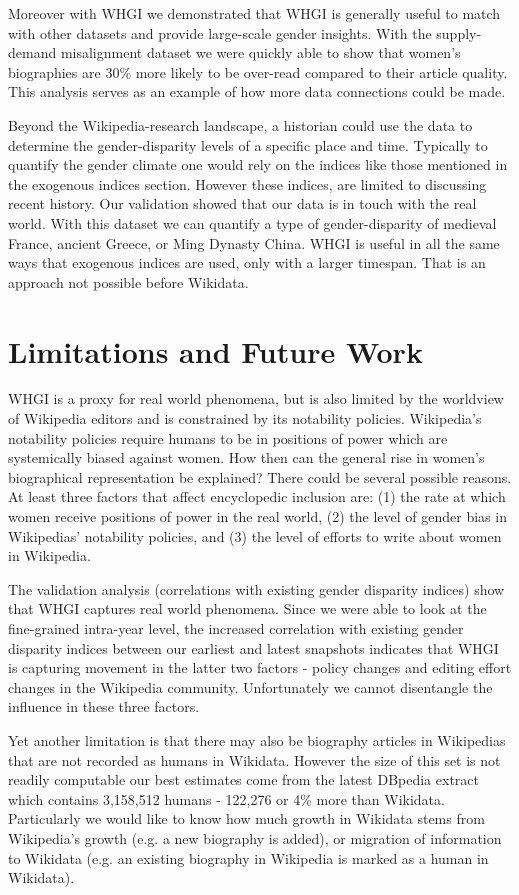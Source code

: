 \documentclass{sig-alternate-05-2015}
\begin{document}
Moreover with WHGI we demonstrated that WHGI is generally useful to match with other datasets and provide large-scale gender insights. With the supply-demand misalignment dataset we were quickly able to show that women's biographies are 30\% more likely to be over-read compared to their article quality. This analysis serves as an example of how more data connections could be made. 

Beyond the Wikipedia-research landscape, a historian could use the data to determine the gender-disparity levels of a specific place and time. Typically to quantify the gender climate one would rely on the indices like those mentioned in the exogenous indices section. However these indices, are limited to discussing recent history. Our validation showed that our data is in touch with the real world. With this dataset we can quantify a type of gender-disparity of medieval France, ancient Greece, or Ming Dynasty China. WHGI is useful in all the same ways that exogenous indices are used, only with a larger timespan. That is an approach not possible before Wikidata.

\section{Limitations and Future Work}
WHGI is a proxy for real world phenomena, but is also limited by the worldview of Wikipedia editors and is constrained by its notability policies. 
Wikipedia's notability policies require humans to be in positions of power which are systemically biased against women. How then can the general rise in women's biographical representation be explained? There could be several possible reasons. At least three factors that affect encyclopedic inclusion are: (1) the rate at which women receive positions of power in the real world, (2) the level of gender bias in Wikipedias' notability policies, and (3) the level of efforts to write about women in Wikipedia. 

The validation analysis (correlations with existing gender disparity indices) show that WHGI captures real world phenomena. Since we were able to look at the fine-grained intra-year level, the increased correlation with existing gender disparity indices between our earliest and latest snapshots indicates that WHGI is capturing movement in the latter two factors - policy changes and editing effort changes in the Wikipedia community. Unfortunately we cannot disentangle the influence in these three factors.

Yet another limitation is that there may also be biography articles in Wikipedias that are not recorded as humans in Wikidata. However the size of this set is not readily computable our best estimates come from the latest DBpedia extract which contains 3,158,512 humans - 122,276 or 4\% more than Wikidata. Particularly we would like to know how much growth in Wikidata stems from Wikipedia's growth (e.g. a new biography is added), or migration of information to Wikidata (e.g. an existing biography in Wikipedia is marked as a human in Wikidata).
\end{document}
